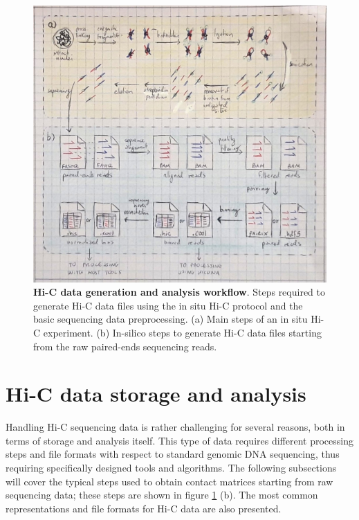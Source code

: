 \begin{figure}[ht]
  \centering
  \includegraphics[width=1\textwidth]{hic_pipeline.jpeg}
  \caption{\textbf{Hi-C data generation and analysis workflow}. Steps required to generate Hi-C data files using the in situ Hi-C protocol and the basic sequencing data preprocessing. (a) Main steps of an in situ Hi-C experiment. (b) In-silico steps to generate Hi-C data files starting from the raw paired-ends sequencing reads.}
  \label{fig:pipeline}
\end{figure}

\newpage
\section{Hi-C data storage and analysis}

Handling Hi-C sequencing data is rather challenging for several reasons, both in terms of storage and analysis itself. This type of data requires different processing steps and file formats with respect to standard genomic DNA sequencing, thus requiring specifically designed tools and algorithms. The following subsections will cover the typical steps used to obtain contact matrices starting from raw sequencing data\cite{hicprocessing2018}; these steps are shown in figure \ref{fig:pipeline} (b). The most common representations and file formats for Hi-C data are also presented.

